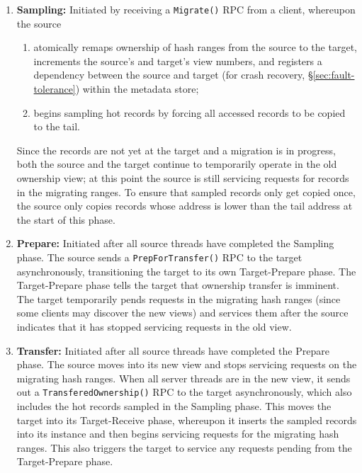 \begin{enumerate}
\item {\bf Sampling:}
Initiated by receiving a \texttt{Migrate()} RPC from a client, whereupon the source
\begin{enumerate}
  \item atomically remaps ownership of hash ranges from the source to the
    target, increments the source's and target's view numbers, and registers a
    dependency between the source and target (for crash recovery,
    \S\ref{sec:fault-tolerance}) within the metadata store;
  \item begins sampling hot records by forcing all accessed
    records to be copied to the \hlog tail.
\end{enumerate}

Since the records are not yet at the target and a migration is in
progress, both the source and the target continue to temporarily operate in the
old ownership view; at this point the source is still servicing requests for
records in the migrating ranges.
%
To ensure that sampled records only get copied once, the source only copies
records whose address is lower than the \hlog tail address at the start of this
phase.

\item {\bf Prepare:}
Initiated after all source threads have completed the Sampling phase.
%
The source sends a \texttt{PrepForTransfer()} RPC to the target asynchronously,
transitioning the target to its own Target-Prepare phase.
The Target-Prepare phase tells the target that ownership transfer is
imminent. The target temporarily pends requests in the migrating hash
ranges (since some clients may discover the new views) and
services them after the source indicates that it has stopped servicing
requests in the old view.

\item {\bf Transfer:}
Initiated after all source threads have completed the Prepare phase.
%
The source moves into its new view and stops servicing requests on the
migrating hash ranges.
%
When all server threads are in the new view, it sends out a
\texttt{TransferedOwnership()} RPC to the target asynchronously, which also
includes the hot records sampled in the Sampling phase.
%
This moves the target into its Target-Receive phase, whereupon it inserts the sampled
records into its \faster instance and then begins servicing requests for
the migrating hash ranges.
%
This also triggers the target to service any requests pending from the
Target-Prepare phase.


\end{enumerate}
